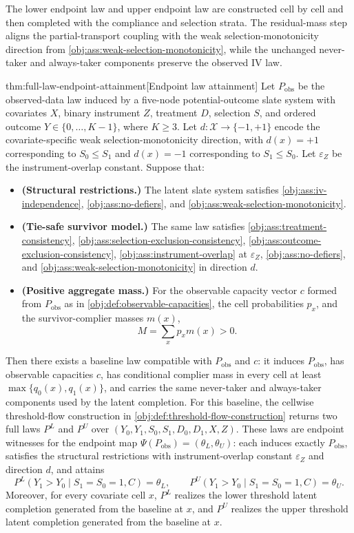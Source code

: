 The lower endpoint law  and upper endpoint law  are constructed cell by cell and then completed with the compliance and selection strata. The residual-mass step aligns the partial-transport coupling with the weak selection-monotonicity direction from \cref{obj:ass:weak-selection-monotonicity}, while the unchanged never-taker and always-taker components preserve the observed IV law.

\begin{theoremv}{thm:full-law-endpoint-attainment}[Endpoint law attainment]
Let \(P_{\mathrm{obs}}\) be the observed-data law induced by a five-node potential-outcome slate system with covariates \(X\), binary instrument \(Z\), treatment \(D\), selection \(S\), and ordered outcome \(Y\in\{0,\ldots,K-1\}\), where \(K\ge 3\). Let \(d:\mathcal X\to\{-1,+1\}\) encode the covariate-specific weak selection-monotonicity direction, with \(d(x)=+1\) corresponding to \(S_0\le S_1\) and \(d(x)=-1\) corresponding to \(S_1\le S_0\). Let \(\varepsilon_Z\) be the instrument-overlap constant. Suppose that:
\begin{itemize}
\item \textbf{(Structural restrictions.)} The latent slate system satisfies \cref{obj:ass:iv-independence}, \cref{obj:ass:no-defiers}, and \cref{obj:ass:weak-selection-monotonicity}.
\item \textbf{(Tie-safe survivor model.)} The same law satisfies \cref{obj:ass:treatment-consistency}, \cref{obj:ass:selection-exclusion-consistency}, \cref{obj:ass:outcome-exclusion-consistency}, \cref{obj:ass:instrument-overlap} at \(\varepsilon_Z\), \cref{obj:ass:no-defiers}, and \cref{obj:ass:weak-selection-monotonicity} in direction \(d\).
\item \textbf{(Positive aggregate mass.)} For the observable capacity vector \(c\) formed from \(P_{\mathrm{obs}}\) as in \cref{obj:def:observable-capacities}, the cell probabilities \(p_x\), and the survivor-complier masses \(m(x)\),
\[
M=\sum_x p_x m(x)>0.
\]
\end{itemize}
Then there exists a baseline law compatible with \(P_{\mathrm{obs}}\) and \(c\): it induces \(P_{\mathrm{obs}}\), has observable capacities \(c\), has conditional complier mass in every cell at least \(\max\{q_0(x),q_1(x)\}\), and carries the same never-taker and always-taker components used by the latent completion. For this baseline, the cellwise threshold-flow construction in \cref{obj:def:threshold-flow-construction} returns two full laws \(P^L\) and \(P^U\) over \((Y_0,Y_1,S_0,S_1,D_0,D_1,X,Z)\). These laws are endpoint witnesses for the endpoint map \(\Psi(P_{\mathrm{obs}})=(\theta_L,\theta_U)\): each induces exactly \(P_{\mathrm{obs}}\), satisfies the structural restrictions with instrument-overlap constant \(\varepsilon_Z\) and direction \(d\), and attains
\[
P^L(Y_1>Y_0\mid S_1=S_0=1,C)=\theta_L,
\qquad
P^U(Y_1>Y_0\mid S_1=S_0=1,C)=\theta_U.
\]
Moreover, for every covariate cell \(x\), \(P^L\) realizes the lower threshold latent completion generated from the baseline at \(x\), and \(P^U\) realizes the upper threshold latent completion generated from the baseline at \(x\).
\end{theoremv}

